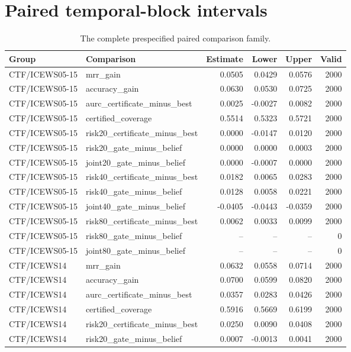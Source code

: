 \section{Paired temporal-block intervals}\small\begin{longtable}{llrrrr}\caption{The complete prespecified paired comparison family.}\\\toprule Group & Comparison & Estimate & Lower & Upper & Valid\\\midrule\endhead
CTF/ICEWS05-15 & mrr\_gain & 0.0505 & 0.0429 & 0.0576 & 2000\\
CTF/ICEWS05-15 & accuracy\_gain & 0.0630 & 0.0530 & 0.0725 & 2000\\
CTF/ICEWS05-15 & aurc\_certificate\_minus\_best & 0.0025 & -0.0027 & 0.0082 & 2000\\
CTF/ICEWS05-15 & certified\_coverage & 0.5514 & 0.5323 & 0.5721 & 2000\\
CTF/ICEWS05-15 & risk20\_certificate\_minus\_best & 0.0000 & -0.0147 & 0.0120 & 2000\\
CTF/ICEWS05-15 & risk20\_gate\_minus\_belief & 0.0000 & 0.0000 & 0.0003 & 2000\\
CTF/ICEWS05-15 & joint20\_gate\_minus\_belief & 0.0000 & -0.0007 & 0.0000 & 2000\\
CTF/ICEWS05-15 & risk40\_certificate\_minus\_best & 0.0182 & 0.0065 & 0.0283 & 2000\\
CTF/ICEWS05-15 & risk40\_gate\_minus\_belief & 0.0128 & 0.0058 & 0.0221 & 2000\\
CTF/ICEWS05-15 & joint40\_gate\_minus\_belief & -0.0405 & -0.0443 & -0.0359 & 2000\\
CTF/ICEWS05-15 & risk80\_certificate\_minus\_best & 0.0062 & 0.0033 & 0.0099 & 2000\\
CTF/ICEWS05-15 & risk80\_gate\_minus\_belief & -- & -- & -- & 0\\
CTF/ICEWS05-15 & joint80\_gate\_minus\_belief & -- & -- & -- & 0\\
CTF/ICEWS14 & mrr\_gain & 0.0632 & 0.0558 & 0.0714 & 2000\\
CTF/ICEWS14 & accuracy\_gain & 0.0700 & 0.0599 & 0.0820 & 2000\\
CTF/ICEWS14 & aurc\_certificate\_minus\_best & 0.0357 & 0.0283 & 0.0426 & 2000\\
CTF/ICEWS14 & certified\_coverage & 0.5916 & 0.5669 & 0.6199 & 2000\\
CTF/ICEWS14 & risk20\_certificate\_minus\_best & 0.0250 & 0.0090 & 0.0408 & 2000\\
CTF/ICEWS14 & risk20\_gate\_minus\_belief & 0.0007 & -0.0013 & 0.0041 & 2000\\

\end{longtable}
